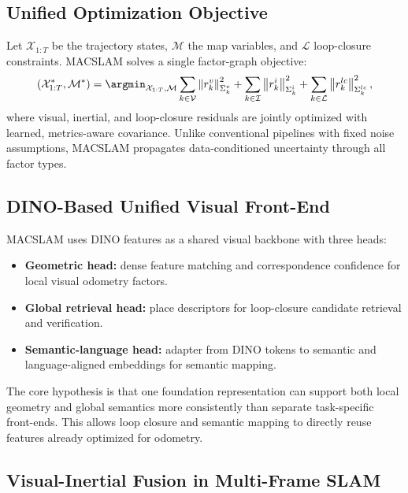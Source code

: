 \subsection{Unified Optimization Objective}

Let $\mathcal{X}_{1:T}$ be the trajectory states, $\mathcal{M}$ the map variables, and $\mathcal{L}$ loop-closure constraints.
MACSLAM solves a single factor-graph objective:
\begin{equation}
\label{eq:macslam:objective}
(\mathcal{X}_{1:T}^{*}, \mathcal{M}^{*})
=
\argmin_{\mathcal{X}_{1:T},\mathcal{M}}
\sum_{k\in\mathcal{V}} \left\| r_k^{v} \right\|_{{\Sigma}_k^{v}}^{2}
+
\sum_{k\in\mathcal{I}} \left\| r_k^{i} \right\|_{{\Sigma}_k^{i}}^{2}
+
\sum_{k\in\mathcal{L}} \left\| r_k^{lc} \right\|_{{\Sigma}_k^{lc}}^{2},
\end{equation}
where visual, inertial, and loop-closure residuals are jointly optimized with learned, metrics-aware covariance.
Unlike conventional pipelines with fixed noise assumptions, MACSLAM propagates data-conditioned uncertainty through all factor types.

\subsection{DINO-Based Unified Visual Front-End}

MACSLAM uses DINO features as a shared visual backbone with three heads:
\begin{itemize}
    \item \textbf{Geometric head:} dense feature matching and correspondence confidence for local visual odometry factors.
    \item \textbf{Global retrieval head:} place descriptors for loop-closure candidate retrieval and verification.
    \item \textbf{Semantic-language head:} adapter from DINO tokens to semantic and language-aligned embeddings for semantic mapping.
\end{itemize}

The core hypothesis is that one foundation representation can support both local geometry and global semantics more consistently than separate task-specific front-ends.
This allows loop closure and semantic mapping to directly reuse features already optimized for odometry.

\subsection{Visual-Inertial Fusion in Multi-Frame SLAM}

